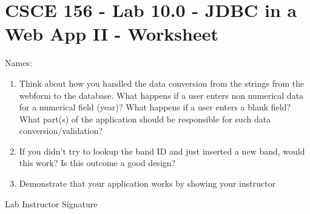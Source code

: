 \documentclass[12pt]{scrartcl}
\begin{document}
\section*{CSCE 156 - Lab 10.0 - JDBC in a Web App II - Worksheet}

Names: \underline{\hspace{10cm}}

\begin{enumerate}

  \item Think about how you handled the data conversion from 
  the strings from the webform to the database.  What happens 
  if a user enters non numerical data for a numerical field 
  (year)?  What happens if a user enters a blank field?  What 
  part(s) of the application should be responsible for such 
  data conversion/validation?  

  \item If you didn't try to lookup the band ID and just 
  inserted a new band, would this work?  Is this outcome 
  a good design?
  
  \item Demonstrate that your application works by showing 
  your instructor


\end{enumerate}

Lab Instructor Signature\underline{\hspace{7.5cm}}
\end{document}
